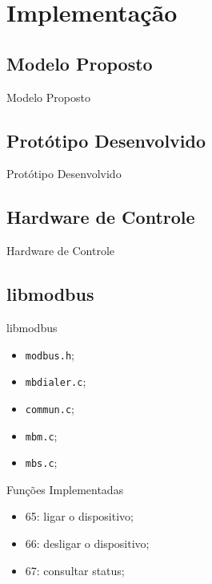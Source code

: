 \renewcommand{\titulo}{Implementação}
\section{\titulo}

\renewcommand{\titulo}{Modelo Proposto}
\subsection{\titulo}
\begin{frame}{\titulo}
\end{frame}

\renewcommand{\titulo}{Protótipo Desenvolvido}
\subsection{\titulo}
\begin{frame}{\titulo}
\end{frame}

\renewcommand{\titulo}{Hardware de Controle}
\subsection{\titulo}
\begin{frame}{\titulo}
\end{frame}

\renewcommand{\titulo}{libmodbus}
\subsection{\titulo}
\begin{frame}{\titulo}
\begin{itemize}
\item \texttt{modbus.h};
\item \texttt{mbdialer.c};
\item \texttt{commun.c};
\item \texttt{mbm.c};
\item \texttt{mbs.c};
\end{itemize}
\end{frame}

\begin{frame}{Funções Implementadas}
\begin{itemize}
\item 65: ligar o dispositivo;
\item 66: desligar o dispositivo;
\item 67: consultar status;
\end{itemize}
\end{frame}

